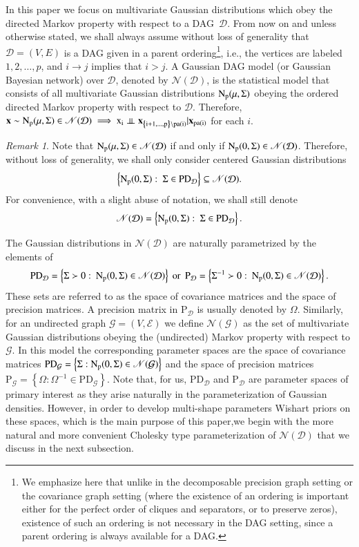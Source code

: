 \documentclass[12pt]{article}
\newcommand{\D}{\mathcal{D}}
\newcommand{\G}{\mathcal{G}}
\newcommand{\pa}{\mathrm{pa}}
\providecommand{\Perp}{}
\renewcommand{\Perp}{\perp\!\!\!\perp}
\newcommand{\Pd}{\mathrm{P}_{\D}}
\theoremstyle{plain}
\theoremstyle{definition}
\theoremstyle{remark}
\newtheorem{Rem}[theorem]{Remark}
\begin{document}
\noindent In this paper we focus on multivariate Gaussian distributions which obey the directed Markov property with respect to  a DAG~$\D$. From now on and unless otherwise stated, we shall always assume without loss of generality that $\D=(V, E)$ is a DAG given in a parent ordering\footnote{We emphasize here that unlike in the decomposable precision graph setting or the covariance graph setting (where the existence of  an ordering is important either for the perfect order of cliques and separators, or to preserve zeros), existence of such an ordering is not necessary in the DAG setting, since a parent ordering is always available for a DAG.}, i.e., the vertices are labeled $1,2,\ldots,p$, and $i\rightarrow j$ implies that $i>j$. A Gaussian DAG model (or Gaussian Bayesian network) over $\D$, denoted by   $\mathscr{N}(\D)$,  is  the statistical model  that consists of all multivariate Gaussian distributions  $\rm{N}_{p}(\mu,\Sigma)$  obeying the ordered directed Markov property
with respect to   $\D$. Therefore, $
\mathbf{x}\sim \rm{N}_{p}(\mu,\Sigma)\in \mathscr{N}(\D)\implies x_i\Perp \mathbf{x}_{\left\{i+1,\ldots,p\right\}\setminus \pa(i)}|\mathbf{x}_{\pa(i)}$ for each $i$.
 \begin{Rem} Note that $\rm{N}_{p}(\mu,  \Sigma)\in \mathscr{N}(\D)$   if and only if     $\rm{N}_{p}(0,  \Sigma)\in \mathscr{N}(\D)$. Therefore, without loss of generality, we shall only consider centered Gaussian distributions $$\left\{\rm{N}_{p}(0, \Sigma):~\Sigma\in \mathrm{PD}_{\D} \right\}\subseteq\mathscr{N}(\D).$$
\noindent For convenience, with a slight abuse of notation, we shall still denote
\[
\mathscr{N}(\D)=\left\{\rm{N}_{p}(0, \Sigma):~\Sigma\in \mathrm{PD}_{\D} \right\}.
\]
 \end{Rem}
\noindent The Gaussian distributions in $\mathscr{N}(\D)$ are naturally parametrized by the elements of 
\[
\mathrm{PD}_{\D}=\left\{\Sigma \succ 0: \: \rm{N}_{p}(0,\Sigma)\in \mathscr{N}(\D)\right\}\text{ or } \:  \mathrm{P}_{\D}=\left\{\Sigma^{-1}\succ 0: \:   \rm{N}_{p}(0,\Sigma)\in \mathscr{N}(\D)\right\}.
\]
 These sets are referred to as the space of covariance matrices and the space of precision matrices. A precision matrix in $\Pd$ is usually denoted by $\Omega$. Similarly, for an undirected graph $\G=(V, \mathscr{E})$ we define $\mathscr{N}(\G)$ as the set of multivariate Gaussian distributions obeying the (undirected) Markov property with respect to   $\G$. In this model the corresponding parameter spaces are the space of covariance matrices $ \mathrm{PD}_{\G}=\left\{\Sigma:  \rm{N}_{p}(0,\Sigma)\in \mathscr{N}(\G)\right\}$ and the space of precision matrices $\mathrm{P}_{\G}=\left\{\Omega :  \Omega^{-1}\in \mathrm{PD}_{\G}\right\}$. Note that, for us, $\mathrm{PD}_{\D}$ and $\Pd$ are  parameter spaces of primary interest as they arise naturally in the parameterization of  Gaussian densities. However, in order to develop multi-shape parameters Wishart priors on these spaces, which is the main purpose of this paper,we begin with the more natural and more convenient  Cholesky type parameterization of $\mathscr{N}(\D)$ that we discuss in the next subsection.  
\end{document}
